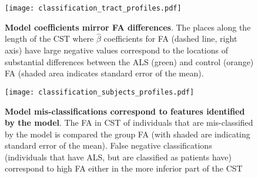 \begin{figure}[!h]
    \centering
    \texttt{[image: classification\_tract\_profiles.pdf]}
    \caption{{\bf Model coefficients mirror FA differences}. The places along the
       length of the CST  where $\hat{\beta}$ coefficients for FA
       (dashed line, right axis) have large negative values correspond to the
       locations of substantial differences between the ALS (green) and control
       (orange) FA (shaded area indicates standard error of the mean).}
    \label{fig:class-profiles}
\end{figure}


\begin{figure}[!h]
    \centering
        \texttt{[image: classification\_subjects\_profiles.pdf]}
    \caption{{\bf Model mis-classifications correspond to features identified by
       the model}. The FA in CST of individuals that are mis-classified by the
       model is compared the group FA (with shaded are indicating standard error
       of the mean). False negative classifications (individuals that have ALS,
       but are classified as patients have) correspond to high FA either in the
       more inferior part of the CST}
    \label{fig:class-errors}
\end{figure}
